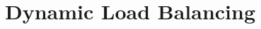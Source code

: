 ~\cite{Giuliani2019} %

\section{Dynamic Load Balancing}\label{section:literature_review:load_balancing}

~\cite{Karypis1997} %
~\cite{Karypis1997P} %

~\cite{MacNeice2000} %
~\cite{Peplinski2016} %
